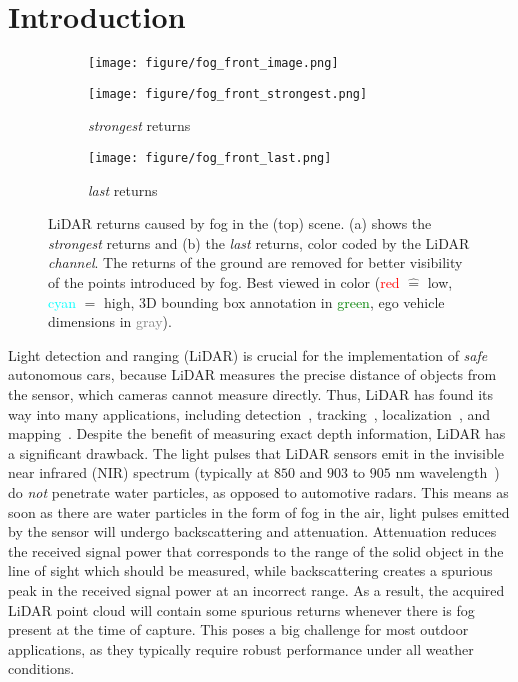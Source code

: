\documentclass[10pt,twocolumn,letterpaper]{article}
\begin{document}
%
 \section{Introduction}
\label{sec:intro}

\begin{figure}
     \centering
     \begin{subfigure}[b]{\linewidth}
         \centering
         \texttt{[image: figure/fog\_front\_image.png]}
     \end{subfigure}
     \begin{subfigure}[b]{0.495\linewidth}
         \centering
         \texttt{[image: figure/fog\_front\_strongest.png]}
         \caption{\textit{strongest} returns}
         \label{fig:fog_front_strongest}
     \end{subfigure}
     \hfill
     \begin{subfigure}[b]{0.495\linewidth}
         \centering
         \texttt{[image: figure/fog\_front\_last.png]}
         \caption{\textit{last} returns}
         \label{fig:fog_front_last}
     \end{subfigure}
     \caption{LiDAR returns caused by fog in the (top) scene. (a) shows the \textit{strongest} returns and (b) the \textit{last} returns, color coded by the LiDAR \textit{channel}. 
     The returns of the ground are removed for better visibility of the points introduced by fog.
     Best viewed in color (\textcolor{red}{red} $\widehat{=}$ low, \textcolor{cyan}{cyan} $\widehat{=}$ high, 
     3D bounding box annotation in \textcolor{green}{green}, ego vehicle dimensions in \textcolor{gray}{gray}).}
     \label{fig:fog_front}
\end{figure}

Light detection and ranging (LiDAR) is crucial for the implementation of \textit{safe} autonomous cars, because LiDAR measures the precise distance of objects from the sensor, which cameras cannot measure directly. Thus, LiDAR has found its way into many applications, including detection~\cite{PP, PV-RCNN}, tracking~\cite{tracking, robotics8030075}, localization~\cite{localization, survey}, and mapping~\cite{LOAM, SLAM}. Despite the benefit of measuring exact depth information, LiDAR has a significant drawback. The light pulses that LiDAR sensors emit in the invisible near infrared (NIR) spectrum (typically at $850$ and $903$ to $905$ nm wavelength~\cite{LIBRE}) do \textit{not} penetrate water particles, as opposed to automotive radars. This means as soon as there are water particles in the form of fog in the air, light pulses emitted by the sensor will undergo backscattering and attenuation. Attenuation reduces the received signal power that corresponds to the range of the solid object in the line of sight which should be measured, while backscattering creates a spurious peak in the received signal power at an incorrect range. As a result, the acquired LiDAR point cloud will contain some spurious returns whenever there is fog present at the time of capture. This poses a big challenge for most outdoor applications, as they typically require robust performance under all weather conditions.
\end{document}
